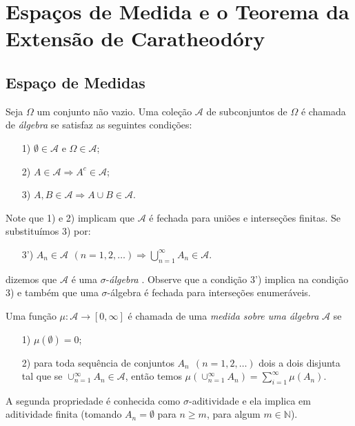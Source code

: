 \chapter[Aula 2]{Espaços de Medida e o Teorema da Extensão de Caratheodóry}
\chaptermark{}
\section{Espaço de Medidas}


Seja $\Omega$ um conjunto não vazio.
Uma coleção $\mathcal{A}$ de subconjuntos de $\Omega$ é chamada de
 {\it álgebra} se satisfaz as seguintes condições:
\begin{itemize}
	\item[1)] $\emptyset\in\mathcal{A}$ e $\Omega\in\mathcal{A}$;
	\item[2)] $A\in \mathcal{A} \Rightarrow A^c\in\mathcal{A}$;
	\item[3)] $A,B\in \mathcal{A} \Rightarrow A\cup B\in\mathcal{A}$.
\end{itemize}
Note que 1) e 2) implicam que $\mathcal{A}$ é fechada para uniões 
e interseções finitas. Se substituímos 3) por:
\begin{itemize}
	\item[3')] $A_n\in\mathcal{A}\ \, (n=1,2,\ldots) 
				\Rightarrow 
				\displaystyle\bigcup_{n=1}^{\infty} A_n \in \mathcal{A}$.
\end{itemize}
dizemos que $\mathcal{A}$ é uma $\sigma$-{\it álgebra}  . Observe que a condição 3') 
implica na condição 3) e também que uma $\sigma$-álgebra é fechada para
interseções enumeráveis.

\begin{definicao}[Medida]
Uma função $\mu:\mathcal{A}\to [0,\infty]$ é chamada de uma {\it medida sobre uma álgebra} 
$\mathcal{A}$ se 
\begin{itemize}
	\item[1)] $\mu(\emptyset)=0$;
	\item[2)] para toda sequência de conjuntos $A_n \ \ (n=1,2,\ldots)$ dois a dois disjunta
				tal que se $\cup_{n=1}^{\infty}A_n \in \mathcal{A}$, então temos
			 $\mu(\cup_{n=1}^{\infty} A_n ) =\sum_{i=1}^{\infty}\mu(A_n)$.
\end{itemize}
\end{definicao}
A segunda propriedade é conhecida como $\sigma$-aditividade e ela implica 
em aditividade finita (tomando $A_n=\emptyset$ para $n\geq m$, para algum $m\in\mathbb{N}$).


